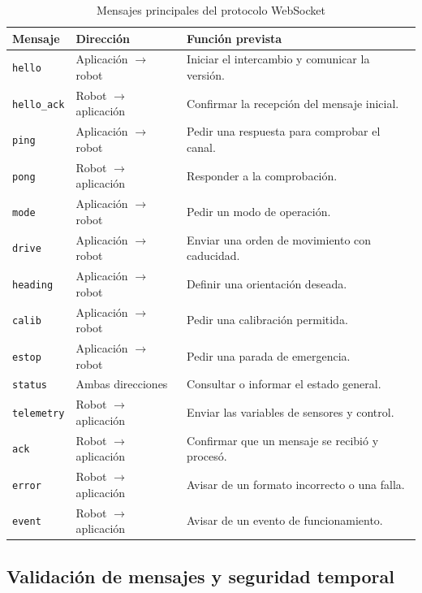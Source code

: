 \documentclass[journal]{IEEEtran}
\begin{document}
\begin{table}[t]
\centering
\caption{Mensajes principales del protocolo WebSocket}
\label{tab:mensajes}
\scriptsize
\begin{tabular}{p{} p{} p{}}
\toprule
\textbf{Mensaje} & \textbf{Dirección} & \textbf{Función prevista} \\
\midrule
\texttt{hello} & Aplicación $\rightarrow$ robot & Iniciar el intercambio y comunicar la versión. \\
\texttt{hello\_ack} & Robot $\rightarrow$ aplicación & Confirmar la recepción del mensaje inicial. \\
\texttt{ping} & Aplicación $\rightarrow$ robot & Pedir una respuesta para comprobar el canal. \\
\texttt{pong} & Robot $\rightarrow$ aplicación & Responder a la comprobación. \\
\texttt{mode} & Aplicación $\rightarrow$ robot & Pedir un modo de operación. \\
\texttt{drive} & Aplicación $\rightarrow$ robot & Enviar una orden de movimiento con caducidad. \\
\texttt{heading} & Aplicación $\rightarrow$ robot & Definir una orientación deseada. \\
\texttt{calib} & Aplicación $\rightarrow$ robot & Pedir una calibración permitida. \\
\texttt{estop} & Aplicación $\rightarrow$ robot & Pedir una parada de emergencia. \\
\texttt{status} & Ambas direcciones & Consultar o informar el estado general. \\
\texttt{telemetry} & Robot $\rightarrow$ aplicación & Enviar las variables de sensores y control. \\
\texttt{ack} & Robot $\rightarrow$ aplicación & Confirmar que un mensaje se recibió y procesó. \\
\texttt{error} & Robot $\rightarrow$ aplicación & Avisar de un formato incorrecto o una falla. \\
\texttt{event} & Robot $\rightarrow$ aplicación & Avisar de un evento de funcionamiento. \\
\bottomrule
\end{tabular}
\end{table}

\subsection{Validación de mensajes y seguridad temporal}
\end{document}

